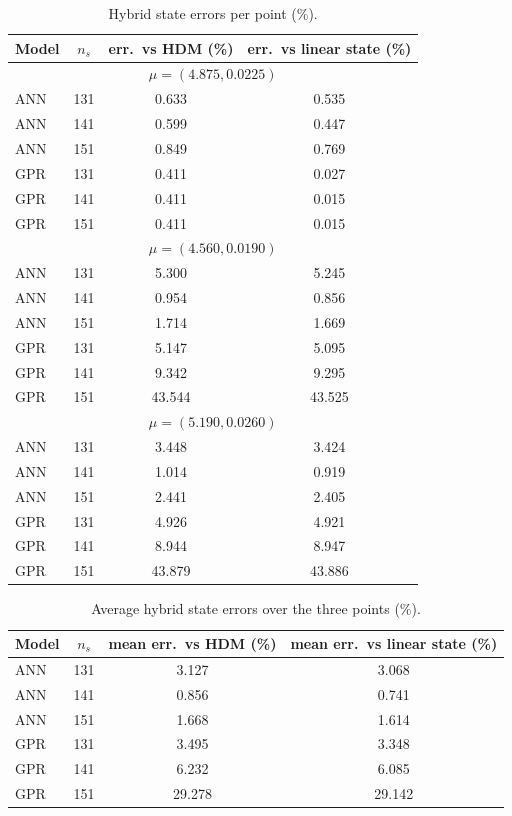 \documentclass[11pt]{article}
\begin{document}
\begin{table}[H]
\centering
\caption{Hybrid state errors per point (\%).}
\begin{tabular}{lccc}
\toprule
Model & $n_s$ & err.\ vs HDM (\%) & err.\ vs linear state (\%) \\
\midrule
\multicolumn{4}{c}{\(\mu=(4.875,0.0225)\)} \\
\midrule
ANN & 131 & 0.633 & 0.535 \\
ANN & 141 & 0.599 & 0.447 \\
ANN & 151 & 0.849 & 0.769 \\
GPR & 131 & 0.411 & 0.027 \\
GPR & 141 & 0.411 & 0.015 \\
GPR & 151 & 0.411 & 0.015 \\
\midrule
\multicolumn{4}{c}{\(\mu=(4.560,0.0190)\)} \\
\midrule
ANN & 131 & 5.300 & 5.245 \\
ANN & 141 & 0.954 & 0.856 \\
ANN & 151 & 1.714 & 1.669 \\
GPR & 131 & 5.147 & 5.095 \\
GPR & 141 & 9.342 & 9.295 \\
GPR & 151 & 43.544 & 43.525 \\
\midrule
\multicolumn{4}{c}{\(\mu=(5.190,0.0260)\)} \\
\midrule
ANN & 131 & 3.448 & 3.424 \\
ANN & 141 & 1.014 & 0.919 \\
ANN & 151 & 2.441 & 2.405 \\
GPR & 131 & 4.926 & 4.921 \\
GPR & 141 & 8.944 & 8.947 \\
GPR & 151 & 43.879 & 43.886 \\
\midrule
\bottomrule
\end{tabular}
\end{table}

\begin{table}[H]
\centering
\caption{Average hybrid state errors over the three points (\%).}
\begin{tabular}{lccc}
\toprule
Model & $n_s$ & mean err.\ vs HDM (\%) & mean err.\ vs linear state (\%) \\
\midrule
ANN & 131 & 3.127 & 3.068 \\
ANN & 141 & 0.856 & 0.741 \\
ANN & 151 & 1.668 & 1.614 \\
GPR & 131 & 3.495 & 3.348 \\
GPR & 141 & 6.232 & 6.085 \\
GPR & 151 & 29.278 & 29.142 \\
\bottomrule
\end{tabular}
\end{table}
\end{document}
